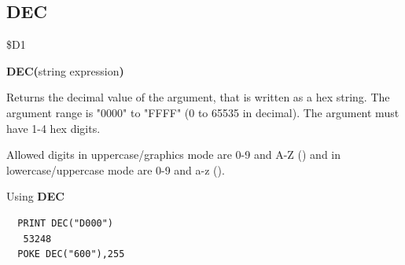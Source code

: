 \subsection{DEC}
\begin{description}[leftmargin=2cm,style=nextline]
\item [Token:] \$D1
\item [Format:] {\bf DEC(}string expression{\bf)}
\item [Usage:] Returns the decimal value
               of the argument, that is written as a hex string.
               The argument range is "0000" to "FFFF" (0 to 65535 in decimal).
               The argument must have 1-4 hex digits.

\item [Remarks:] Allowed digits in uppercase/graphics mode are 0-9 and A-Z ()
                 and in lowercase/uppercase mode are 0-9 and a-z ().

\item [Example:] Using {\bf DEC}
\begin{tcolorbox}[colback=black,coltext=white]
\verbatimfont{\codefont}
\begin{verbatim}
  PRINT DEC("D000")
   53248
  POKE DEC("600"),255
\end{verbatim}
\end{tcolorbox}
\end{description}


\newpage
